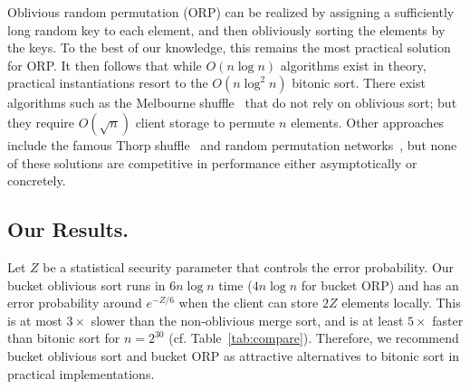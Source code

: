 Oblivious random permutation (ORP) can be realized by assigning a sufficiently long random key to each element, and then obliviously sorting the elements by the keys.
To the best of our knowledge, this remains the most practical solution for ORP.
It then follows that while $O(n \log n)$ algorithms exist in theory, practical instantiations resort to the $O(n \log^2 n)$ bitonic sort.
There exist algorithms such as the Melbourne
shuffle~\cite{ohrimenko2014melbourne} that do not rely on
oblivious sort; but they require $O(\sqrt{n})$ client storage to permute $n$ elements.
Other approaches include the famous Thorp shuffle~\cite{thorp01} and random permutation networks~\cite{randpermnet}, but none of these solutions are competitive in performance either asymptotically or concretely.

\subsection{Our Results.}
Let $Z$ be a statistical security parameter that controls the error probability. 
Our bucket oblivious sort runs in $6n\log n$ time ($4n\log n$ for bucket ORP) and has an error probability around $e^{-Z/6}$ when the client can store $2Z$ elements locally.
This is at most $3\times$ slower than the non-oblivious merge sort, and is at least $5\times$ faster than bitonic sort for $n=2^{30}$ (cf. Table~\ref{tab:compare}).
Therefore, we recommend bucket oblivious sort and bucket ORP as attractive alternatives to bitonic sort in practical implementations.

